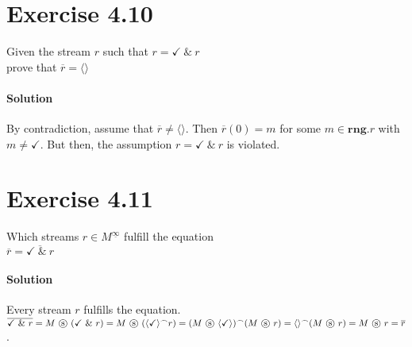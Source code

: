 \documentclass{article}[12pt]
\newcommand{\concat}{\ensuremath{^{\frown}}}
\newcommand{\cons}{\ \&\ }
\newcommand{\stream}[1]{\langle#1\rangle}
\newcommand{\filter}{\ \ensuremath{\text{\textcircled{s}}}\ }
\newcommand{\rng}{\ensuremath{\textbf{rng}}}
\begin{document}
   \section{Exercise 4.10}
   Given the stream $r$ such that $r = \checkmark \cons r$\\
   prove that $\overline{r} = \stream{}$
   \paragraph{Solution}{
       By contradiction, assume that $\overline{r} \neq \stream{}$.
       Then $\overline{r}(0) = m$ for some $m \in \rng.r$ with $m \neq \checkmark$.
       But then, the assumption $r = \checkmark \cons r$ is violated.
    }
   \section{Exercise 4.11}
   Which streams $r \in M^{\underline{\infty}}$ fulfill the equation\\
   $\overline{r} = \overline{\checkmark \cons r}$
   \paragraph{Solution}{
        Every stream $r$ fulfills the equation.
        $\overline{\checkmark \cons r} = M \filter (\checkmark \cons r) = M \filter (\stream{\checkmark} \concat r) = (M \filter \stream{\checkmark}) \concat (M \filter r) = \stream{} \concat (M \filter r) = M \filter r = \overline{r}$.
   }
\end{document}
